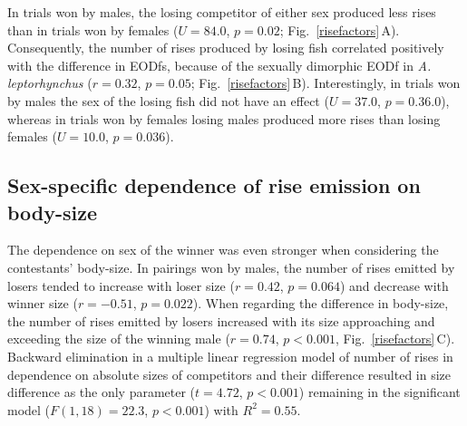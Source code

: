 \documentclass[vruler,JEB]{COB}%
\newcommand{\lepto}{\textit{A. leptorhynchus}}
\newcommand{\figitem}[1]{\textsf{\bfseries\uppercase{#1}}\penalty10000 }
\newcommand{\panel}[1]{\textsf{#1}}
\newcommand{\subfref}[2]{\textup{\ref{#1}}\,\panel{#2}}
\newcommand{\Figb}{Fig.}
\newcommand{\Subfigrefb}[2]{\Figb~\subfref{#1}{#2}}
\begin{document}

In trials won by males, the losing competitor of either sex produced less rises than in trials won by females ($U=84.0$, $p=0.02$; \Subfigrefb{risefactors}{A}). Consequently, the number of rises produced by losing fish correlated positively with the difference in EODfs, because of the sexually dimorphic EODf in \lepto{} ($r=0.32$, $p=0.05$; \Subfigrefb{risefactors}{B}).
Interestingly, in trials won by males the sex of the losing fish did not have an effect ($U=37.0$, $p=0.36.0$), whereas in trials won by females losing males produced more rises than losing females ($U=10.0$, $p=0.036$).

\subsection{Sex-specific dependence of rise emission on body-size}

The dependence on sex of the winner was even stronger when considering the contestants' body-size. In pairings won by males, the number of rises emitted by losers tended to increase with loser size ($r=0.42$, $p=0.064$) and decrease with winner size ($r=-0.51$, $p=0.022$). When regarding the difference in body-size, the number of rises emitted by losers increased with its size approaching and exceeding the size of the winning male ($r=0.74$, $p<0.001$, \Subfigrefb{risefactors}{C}). Backward elimination in a multiple linear regression model of number of rises in dependence on absolute sizes of competitors and their difference resulted in size difference as the only parameter ($t=4.72$, $p<0.001$) remaining in the significant model ($F(1,18)=22.3$, $p<0.001$) with $R^2=0.55$.
\end{document}

